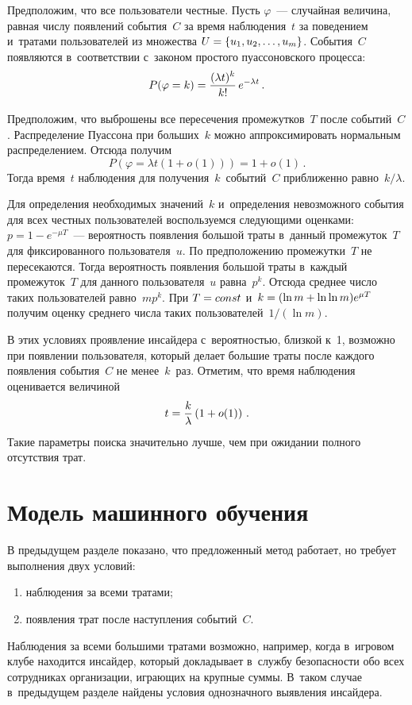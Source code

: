 \begin{multicols}{2}
  Предположим, что все пользователи честные. Пусть $\varphi$~--- случайная 
величина, равная числу появлений события~$C$ за время наблюдения~$t$ за 
поведением и~тратами пользователей из множества $U\hm= \{ u_1, u_2, \ldots , 
u_m\}$. События~$C$ появляются в~соответствии с~законом простого 
пуассоновского процесса:
  $$
  P(\varphi=k)=\displaystyle\frac{\displaystyle (\lambda t)^k\mathstrut}{\displaystyle k!\mathstrut}\,e^{-\lambda t}\,.
  $$
  
  Предположим, что выброшены все пересечения промежутков~$T$ после 
событий~$C$. Распределение Пуассона при больших~$k$ можно 
аппроксимировать нормальным распределением. Отсюда получим
  $$
  P(\varphi=\lambda t(1+o(1)))=1+o(1)\,.
  $$
    Тогда время~$t$ наблюдения для получения~$k$~событий~$C$ приближенно 
равно~$k/\lambda$. 
  
  Для определения необходимых значений~$k$ и~определения невозможного 
события для всех честных пользователей воспользуемся следующими оценками:
    $p=1-e^{-\mu T}$~--- вероятность появления большой траты в~данный 
промежуток~$T$ для фиксированного пользователя~$u$. По предположению 
промежутки~$T$ не пересекаются. Тогда вероятность появления 
большой траты в~каждый промежуток~$T$ для данного пользователя~$u$ равна~$p^k$. Отсюда 
среднее число таких пользователей равно~$mp^k$. При $T\hm= const$ и~$k\hm= 
(\ln m+\ln \ln m)e^{\mu T}$ получим оценку среднего числа таких 
пользователей~$1/(\ln m)$.
  
  В этих условиях проявление инсайдера с~вероятностью, близкой к~1, 
возможно при появлении пользователя, который делает большие траты после 
каждого появления события~$C$ не менее~$k$~раз. Отметим, что время 
наблюдения оценивается величиной 
  $$
  t=\displaystyle\frac{\displaystyle k\mathstrut}{\displaystyle \lambda\mathstrut}\left( 1+o(1)\right)\,.
  $$
Такие параметры поиска значительно лучше, чем при ожидании полного 
отсутствия трат.
  
\section{Модель машинного обучения}
  
  В предыдущем разделе показано, что предложенный метод работает, но 
требует выполнения двух условий: 
  \begin{enumerate}[(1)]
  \item наблюдения за всеми тратами; 
\item появления трат после наступления событий~$C$.
\end{enumerate}
  
  Наблюдения за всеми большими тратами возможно, например, когда 
  в~игровом клубе находится инсайдер, который докладывает в~службу 
безопасности обо всех сотрудниках организации, иг\-ра\-ющих на крупные суммы. 
В~таком случае в~предыду\-щем разделе найдены условия однозначного 
выявления инсайдера.
  

\end{multicols}
